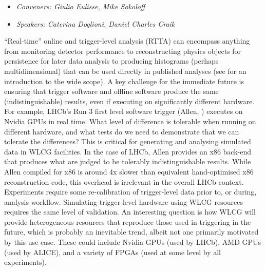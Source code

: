 \documentclass[a4paper,11pt]{article}
\begin{document}
\begin{itemize}
    \item \emph{Conveners: Giulio Eulisse, Mike Sokoloff}
    \item \emph{Speakers: Caterina Doglioni, Daniel Charles Craik}
\end{itemize}

``Real-time'' online and trigger-level analysis (RTTA) can encompass
anything from monitoring detector performance to reconstructing physics
objects for persistence for later data analysis to producing histograms
(perhaps multidimensional) that can be used directly in published
analyses (see \cite{RTAworkshop2019} for an introduction to the wide scope). A key challenge for the immediate future is ensuring that
trigger software and offline software produce the same
(indistinguishable) results, even if executing on significantly
different hardware. For example, LHCb's Run 3 first level software
trigger (Allen, \cite{Aaij2020}) executes on Nvidia GPUs in real time. What level of
difference is tolerable when running on different hardware, and what
tests do we need to demonstrate that we can tolerate the differences?
This is critical for generating and analysing simulated data in WLCG
facilities. In the case of LHCb, Allen provides an x86 back-end that
produces what are judged to be tolerably indistinguishable results.
While Allen compiled for x86 is around 4x slower than equivalent
hand-optimised x86 reconstruction code, this overhead is irrelevant in
the overall LHCb context. Experiments require some re-calibration of
trigger-level data prior to, or during, analysis workflow. Simulating
trigger-level hardware using WLCG resources requires the same level of
validation. An interesting question is how WLCG will provide
heterogeneous resources that reproduce those used in triggering in the
future, which is probably an inevitable trend, albeit not one primarily
motivated by this use case. These could include Nvidia GPUs (used by
LHCb), AMD GPUs (used by ALICE), and a variety of FPGAs (used at some
level by all experiments).
\end{document}
